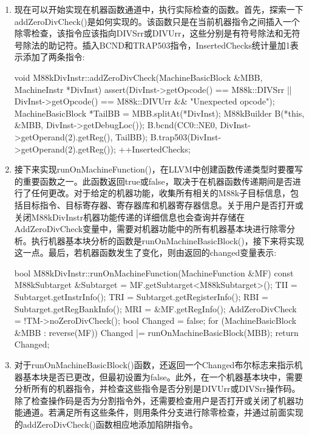 \begin{enumerate}
\item
现在可以开始实现在机器函数通道中，执行实际检查的函数。首先，探索一下addZeroDivCheck()是如何实现的。该函数只是在当前机器指令之间插入一个除零检查，该指令应该指向DIVSrr或DIVUrr，这些分别是有符号除法和无符号除法的助记符。插入BCND和TRAP503指令，InsertedChecks统计量加1表示添加了两条指令:

\begin{cpp}
void M88kDivInstr::addZeroDivCheck(MachineBasicBlock &MBB,
                                   MachineInstr *DivInst) {
    assert(DivInst->getOpcode() == M88k::DIVSrr ||
            DivInst->getOpcode() == M88k::DIVUrr && "Unexpected
            opcode");
    MachineBasicBlock *TailBB = MBB.splitAt(*DivInst);
    M88kBuilder B(*this, &MBB, DivInst->getDebugLoc());
    B.bcnd(CC0::NE0, DivInst->getOperand(2).getReg(), TailBB);
    B.trap503(DivInst->getOperand(2).getReg());
    ++InsertedChecks;
}
\end{cpp}

\item
接下来实现runOnMachineFunction()，在LLVM中创建函数传递类型时要覆写的重要函数之一。此函数返回true或false，取决于在机器函数传递期间是否进行了任何更改。对于给定的机器功能，收集所有相关的M88k子目标信息，包括目标指令、目标寄存器、寄存器库和机器寄存器信息。关于用户是否打开或关闭M88kDivInstr机器功能传递的详细信息也会查询并存储在AddZeroDivCheck变量中，需要对机器功能中的所有机器基本块进行除零分析。执行机器基本块分析的函数是runOnMachineBasicBlock()，接下来将实现这一点。最后，若机器函数发生了变化，则由返回的changed变量表示:

\begin{cpp}
bool M88kDivInstr::runOnMachineFunction(MachineFunction &MF) {
    const M88kSubtarget &Subtarget =
    MF.getSubtarget<M88kSubtarget>();
    TII = Subtarget.getInstrInfo();
    TRI = Subtarget.getRegisterInfo();
    RBI = Subtarget.getRegBankInfo();
    MRI = &MF.getRegInfo();
    AddZeroDivCheck = !TM->noZeroDivCheck();
    bool Changed = false;
    for (MachineBasicBlock &MBB : reverse(MF))
        Changed |= runOnMachineBasicBlock(MBB);
    return Changed;
}
\end{cpp}

\item
对于runOnMachineBasicBlock()函数，还返回一个Changed布尔标志来指示机器基本块是否已更改，但最初设置为false。此外，在一个机器基本块中，需要分析所有的机器指令，并检查这些指令是否分别是DIVUrr或DIVSrr操作码。除了检查操作码是否为分割指令外，还需要检查用户是否打开或关闭了机器功能通道。若满足所有这些条件，则用条件分支进行除零检查，并通过前面实现的addZeroDivCheck()函数相应地添加陷阱指令。


\end{enumerate}
